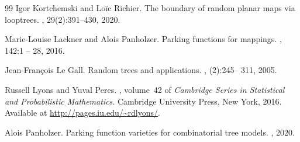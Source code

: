 \begin{thebibliography}{99}
Igor Kortchemski and Loïc Richier.
\newblock The boundary of random planar maps via looptrees.
, 29(2):391--430, 2020.



Marie-Louise Lackner and Alois Panholzer.
\newblock Parking functions for mappings.
, 142:1 -- 28, 2016.


Jean-Fran\c cois Le Gall.
\newblock Random trees and applications.
, (2):245-- 311, 2005.


Russell Lyons and Yuval Peres.
, volume~42 of {\em Cambridge
  Series in Statistical and Probabilistic Mathematics}.
\newblock Cambridge University Press, New York, 2016.
\newblock Available at \url{http://pages.iu.edu/~rdlyons/}.

Alois Panholzer.
\newblock Parking function varieties for combinatorial tree models.
, 2020.

%
%
%
%
%
%
%
%
%
%
%
%
%

\end{thebibliography}
